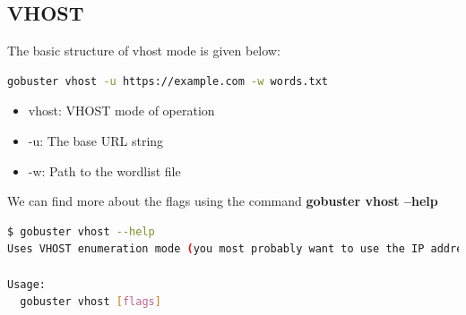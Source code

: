 \documentclass[12 pt]{article}
\begin{document}
\subsection{VHOST}
The basic structure of vhost mode is given below:
\begin{lstlisting}[language=bash]
gobuster vhost -u https://example.com -w words.txt
\end{lstlisting}
\begin{itemize}
    \item vhost: VHOST mode of operation
    \item -u: The base URL string
    \item -w: Path to the wordlist file 
\end{itemize}
We can find more about the flags using the command \textbf{gobuster vhost --help}
\begin{lstlisting}[language=bash]
$ gobuster vhost --help
Uses VHOST enumeration mode (you most probably want to use the IP address as the URL parameter)

Usage:
  gobuster vhost [flags]


\end{lstlisting}
\end{document}
